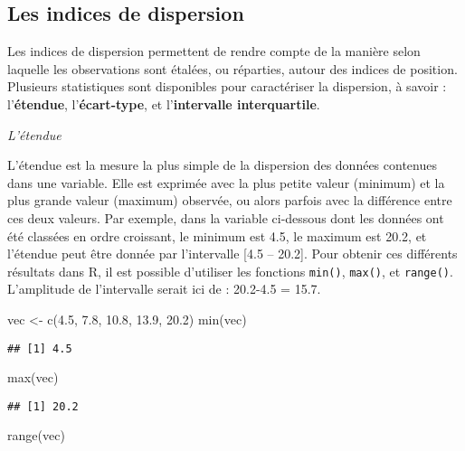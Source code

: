 \documentclass[
]{book}
\newenvironment{Shaded}{\begin{snugshade}}{\end{snugshade}}
\newcommand{\FloatTok}[1]{\textcolor[rgb]{0.00,0.00,0.81}{#1}}
\newcommand{\FunctionTok}[1]{\textcolor[rgb]{0.00,0.00,0.00}{#1}}
\newcommand{\NormalTok}[1]{#1}
\newcommand{\OtherTok}[1]{\textcolor[rgb]{0.56,0.35,0.01}{#1}}
\begin{document}
\hypertarget{les-indices-de-dispersion}{%
\subsection{Les indices de dispersion}\label{les-indices-de-dispersion}}

Les indices de dispersion permettent de rendre compte de la manière selon laquelle les observations sont étalées, ou réparties, autour des indices de position. Plusieurs statistiques sont disponibles pour caractériser la dispersion, à savoir : l'\textbf{étendue}, l'\textbf{écart-type}, et l'\textbf{intervalle interquartile}.

\emph{L'étendue}

L'étendue est la mesure la plus simple de la dispersion des données contenues dans une variable. Elle est exprimée avec la plus petite valeur (minimum) et la plus grande valeur (maximum) observée, ou alors parfois avec la différence entre ces deux valeurs. Par exemple, dans la variable ci-dessous dont les données ont été classées en ordre croissant, le minimum est 4.5, le maximum est 20.2, et l'étendue peut être donnée par l'intervalle {[}4.5 -- 20.2{]}. Pour obtenir ces différents résultats dans R, il est possible d'utiliser les fonctions \texttt{min()}, \texttt{max()}, et \texttt{range()}. L'amplitude de l'intervalle serait ici de : 20.2-4.5 = 15.7.

\begin{Shaded}
\begin{Highlighting}[]
\NormalTok{vec }\OtherTok{\textless{}{-}} \FunctionTok{c}\NormalTok{(}\FloatTok{4.5}\NormalTok{, }\FloatTok{7.8}\NormalTok{, }\FloatTok{10.8}\NormalTok{, }\FloatTok{13.9}\NormalTok{, }\FloatTok{20.2}\NormalTok{)}
\FunctionTok{min}\NormalTok{(vec)}
\end{Highlighting}
\end{Shaded}

\begin{verbatim}
## [1] 4.5
\end{verbatim}

\begin{Shaded}
\begin{Highlighting}[]
\FunctionTok{max}\NormalTok{(vec)}
\end{Highlighting}
\end{Shaded}

\begin{verbatim}
## [1] 20.2
\end{verbatim}

\begin{Shaded}
\begin{Highlighting}[]
\FunctionTok{range}\NormalTok{(vec)}
\end{Highlighting}
\end{Shaded}
\end{document}
